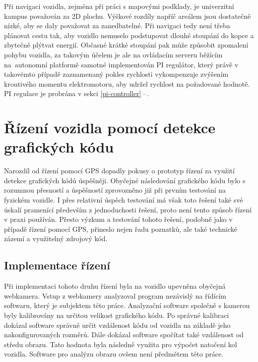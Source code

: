 \documentclass[czech, bachelor]{diploma}
\newcommand{\peteref}[1]{\ref{#1}\,--\,\nameref{#1}}
\begin{document}
Při navigaci vozidla, zejména při práci s mapovými podklady, je univerzitní kampus považován za 2D plochu. Výškové rozdíly napříč
areálem jsou dostatečně nízké, aby se daly považovat za zanedbatelné. Při navigaci tedy není třeba plánovat cestu tak, aby vozidlo
nemuselo podstupovat dlouhé stoupání do kopce a zbytečně plýtvat energií. Občasné krátké stoupání pak může způsobit zpomalení
pohybu vozidla, za takovým účelem je ale na ovládacím serveru běžícím na~autonomní platformě samotné implementován PI regulátor,
který právě v takovémto případě zaznamenaný pokles rychlosti vykompenzuje zvýšením kroutivého momentu elektromotoru, aby udržel
rychlost na požadované hodnotě. PI regulace je probrána v sekci \peteref{pi-controller}.

\section{Řízení vozidla pomocí detekce grafických kódu}

Narozdíl od řízení pomocí GPS dopadly pokusy o prototyp řízení za využití detekce grafických kódů úspěšněji. Obyčejné následování
grafického kódu bylo s rozumnou přesností a úspěšností zprovozněno již při prvním testování na fyzickém vozidle. I přes relativní
úspěch testování má však toto řešení také své úskalí pramenící především z jednoduchosti řešení, proto není tento způsob řízení
v praxi používán. Přesto výzkum a testování tohoto řešení, podobně jako v případě řízení pomocí GPS, přineslo nejen řadu poznatků,
ale také technické zázemí a využitelný zdrojový kód.

\subsection{Implementace řízení}

Při implementaci tohoto druhu řízení byla na vozidlo upevněna obyčejná webkamera. Vstup z webkamery analyzoval program nezávislý
na řídícím softwaru, který je subjektem této práce. Analyzační software společně s kamerou byly kalibrovány na určitou velikost
grafického kódu. Po správné kalibraci dokázal software správně určit vzdálenost kódu od vozidla na základě jeho nakonfigurovaných
rozměrů. Dále dokázal software spočítat také vzdálenost od středu obrazu. Tato hodnota byla následně využita pro výpočet natočení
kol vozidla. Software pro analýzu obrazu ovšem není předmětem této práce.
\end{document}
